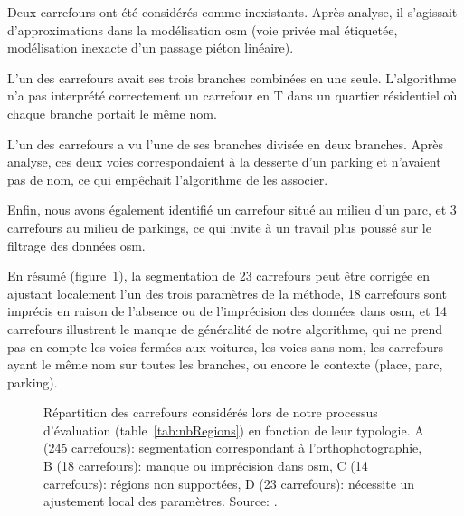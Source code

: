 \newpar{}

Deux carrefours ont été considérés comme inexistants. Après analyse, il s'agissait d'approximations dans la modélisation \gls{osm} (voie privée mal étiquetée, modélisation inexacte d'un passage piéton linéaire).

\newpar{}

L’un des carrefours avait ses trois branches combinées en une seule. L'algorithme n'a pas interprété correctement un carrefour en T dans un quartier résidentiel où chaque branche portait le même nom.

\newpar{}

L’un des carrefours a vu l’une de ses branches divisée en deux branches. Après analyse, ces deux voies correspondaient à la desserte d'un parking et n'avaient pas de nom, ce qui empêchait l'algorithme de les associer.

\newpar{}

Enfin, nous avons également identifié un carrefour situé au milieu d'un parc, et 3 carrefours au milieu de parkings, ce qui invite à un travail plus poussé sur le filtrage des données \gls{osm}.

\newpar{}

En résumé (figure~\ref{fig:camembert}), la segmentation de 23 carrefours peut être corrigée en ajustant localement l'un des trois paramètres de la méthode, 18 carrefours sont imprécis en raison de l'absence ou de l'imprécision des données dans \gls{osm}, et 14 carrefours illustrent le manque de généralité de notre algorithme, qui ne prend pas en compte les voies fermées aux voitures, les voies sans nom, les carrefours ayant le même nom sur toutes les branches, ou encore le contexte (place, parc, parking).

\begin{figure}[ht]
    \centering
    \footnotesize
    \caption[Répartition des carrefours considérés lors du processus d'évaluation]{Répartition des carrefours considérés lors de notre processus d'évaluation (table~\ref{tab:nbRegions}) en fonction de leur typologie. A (245 carrefours): segmentation correspondant à l'orthophotographie, B (18 carrefours): manque ou imprécision dans \gls{osm}, C (14 carrefours): régions non supportées, D (23 carrefours): nécessite un ajustement local des paramètres. Source: \citep{Favreau2022}.}
    \label{fig:camembert}
\end{figure}


